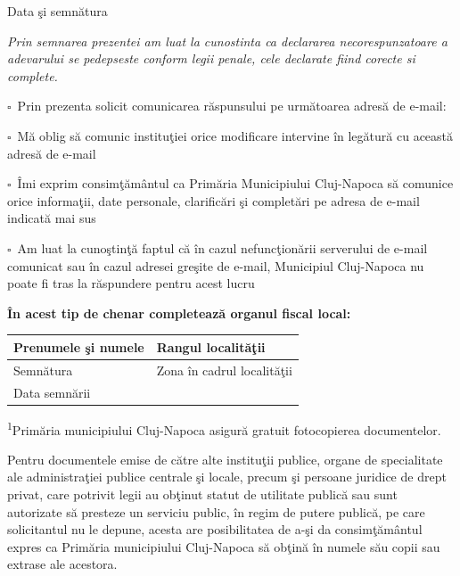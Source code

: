 \documentclass[10pt,a4paper,landscape]{article}
\newcommand{\fillline}[1][6cm]{\underline{\hspace{#1}}}
\newcommand{\checkboxempty}{$\square$}
\begin{document}
\vspace{0.3cm}

Data şi semnătura \fillline[8cm]

\vspace{0.5cm}

\textit{Prin semnarea prezentei am luat la cunostinta ca declararea necorespunzatoare a adevarului se pedepseste conform legii penale, cele declarate fiind corecte si complete.}

\vspace{0.5cm}

\checkboxempty\ Prin prezenta solicit comunicarea răspunsului pe următoarea adresă de e-mail: \fillline[10cm]

\checkboxempty\ Mă oblig să comunic instituţiei orice modificare intervine în legătură cu această adresă de e-mail

\checkboxempty\ Îmi exprim consimţământul ca Primăria Municipiului Cluj-Napoca să comunice orice informaţii, date personale, clarificări şi completări pe adresa de e-mail indicată mai sus

\checkboxempty\ Am luat la cunoştinţă faptul că în cazul nefuncţionării serverului de e-mail comunicat sau în cazul adresei greşite de e-mail, Municipiul Cluj-Napoca nu poate fi tras la răspundere pentru acest lucru

\vspace{0.5cm}

\textbf{În acest tip de chenar completează organul fiscal local:}

\begin{tabularx}{\textwidth}{|X|X|}
\hline
Prenumele şi numele \fillline[6cm] & Rangul localităţii \fillline[4cm] \\
\hline
Semnătura \fillline[6cm] & Zona în cadrul localităţii \fillline[4cm] \\
\hline
Data semnării \fillline[4cm] & \\
\hline
\end{tabularx}

\vspace{0.5cm}

\footnotesize
\textsuperscript{1}Primăria municipiului Cluj-Napoca asigură gratuit fotocopierea documentelor.

Pentru documentele emise de către alte instituţii publice, organe de specialitate ale administraţiei publice centrale şi locale, precum şi persoane juridice de drept privat, care potrivit legii au obţinut statut de utilitate publică sau sunt autorizate să presteze un serviciu public, în regim de putere publică, pe care solicitantul nu le depune, acesta are posibilitatea de a-şi da consimţământul expres ca Primăria municipiului Cluj-Napoca să obţină în numele său copii sau extrase ale acestora.
\end{document}
